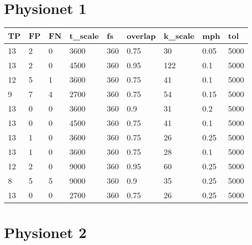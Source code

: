 \section{Physionet 1}

\begin{table}[!ht]
    \centering
    \begin{tabular}{|l|l|l|l|l|l|l|l|l|}
    \hline
        TP & FP & FN & t\_scale & fs & overlap & k\_scale & mph & tol \\ \hline
        13 & 2 & 0 & 3600 & 360 & 0.75 & 30 & 0.05 & 5000 \\ \hline
        13 & 2 & 0 & 4500 & 360 & 0.95 & 122 & 0.1 & 5000 \\ \hline
        12 & 5 & 1 & 3600 & 360 & 0.75 & 41 & 0.1 & 5000 \\ \hline
        9 & 7 & 4 & 2700 & 360 & 0.75 & 54 & 0.15 & 5000 \\ \hline
        13 & 0 & 0 & 3600 & 360 & 0.9 & 31 & 0.2 & 5000 \\ \hline
        13 & 0 & 0 & 4500 & 360 & 0.75 & 41 & 0.1 & 5000 \\ \hline
        13 & 1 & 0 & 3600 & 360 & 0.75 & 26 & 0.25 & 5000 \\ \hline
        13 & 1 & 0 & 3600 & 360 & 0.75 & 28 & 0.1 & 5000 \\ \hline
        12 & 2 & 0 & 9000 & 360 & 0.95 & 60 & 0.25 & 5000 \\ \hline
        8 & 5 & 5 & 9000 & 360 & 0.9 & 35 & 0.25 & 5000 \\ \hline
        13 & 0 & 0 & 2700 & 360 & 0.75 & 26 & 0.25 & 5000 \\ \hline
    \end{tabular}
\end{table}

\section{Physionet 2}

